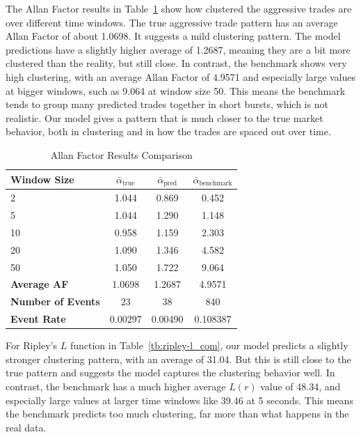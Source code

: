 The Allan Factor results in Table~\ref{tb:allan-factor_com} show how clustered the aggressive trades are over different time windows. The true aggressive trade pattern has an average Allan Factor of about 1.0698. It suggests a mild clustering pattern. The model predictions have a slightly higher average of 1.2687, meaning they are a bit more clustered than the reality, but still close. In contrast, the benchmark shows very high clustering, with an average Allan Factor of 4.9571 and especially large values at bigger windows, such as 9.064 at window size 50. This means the benchmark tends to group many predicted trades together in short bursts, which is not realistic. Our model gives a pattern that is much closer to the true market behavior, both in clustering and in how the trades are spaced out over time.
\begin{table}[H]
    \centering
    \caption{Allan Factor Results Comparison}
    \label{tb:allan-factor_com}
    \begin{tabular}{lccc}
    \toprule
    \textbf{Window Size} & $\bar{\alpha}_\text{true}$ & $\bar{\alpha}_\text{pred}$ & $\bar{\alpha}_\text{benchmark}$ \\
    \midrule
    2   & 1.044 & 0.869 & 0.452 \\
    5   & 1.044 & 1.290 & 1.148 \\
    10  & 0.958 & 1.159 & 2.303 \\
    20  & 1.090 & 1.346 & 4.582 \\
    50  & 1.050 & 1.722 & 9.064 \\
    \midrule
    \textbf{Average AF} & 1.0698 & 1.2687 & 4.9571 \\
    \textbf{Number of Events} & 23 & 38 & 840 \\
    \textbf{Event Rate} & 0.00297 & 0.00490 & 0.108387 \\
    \bottomrule
    \end{tabular}
\end{table}


For Ripley's \(L\) function in Table~\ref{tb:ripley-l_com}, our model predicts a slightly stronger clustering pattern, with an average of 31.04. But this is still close to the true pattern and suggests the model captures the clustering behavior well. In contrast, the benchmark has a much higher average \(L(r)\) value of 48.34, and especially large values at larger time windows like 39.46 at 5 seconds. This means the benchmark predicts too much clustering, far more than what happens in the real data. 


